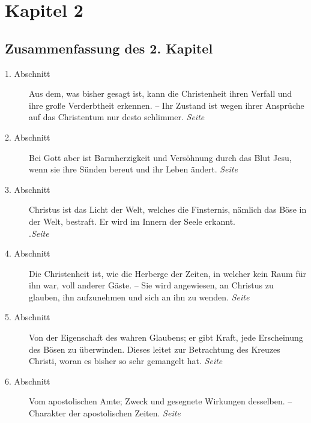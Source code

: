 
\chapter{Kapitel 2} \label{kap2}


\section{Zusammenfassung des 2. Kapitel}

\begin{description}
\item[1. Abschnitt] Aus dem, was bisher gesagt ist, kann die Christenheit ihren
Verfall und ihre große Verderbtheit erkennen. -- Ihr Zustand ist wegen ihrer
Ansprüche auf das Christentum
 nur desto schlimmer.
\dotfill \textit{Seite~\pageref{kap2_ab1}}\\

\item[2. Abschnitt] Bei Gott aber ist Barmherzigkeit und Versöhnung durch das
Blut Jesu, wenn sie ihre Sünden bereut und ihr Leben ändert.
\dotfill \textit{Seite~\pageref{kap2_ab2}}\\

\item[3. Abschnitt] Christus ist das Licht der Welt, welches die Finsternis,
nämlich das Böse in der Welt, bestraft. Er wird im Innern der Seele erkannt.
\\.\dotfill \textit{Seite~\pageref{kap2_ab3}}\\

\item[4. Abschnitt] Die Christenheit ist, wie die Herberge der Zeiten, in
welcher kein Raum für ihn war, voll anderer Gäste. -- Sie wird angewiesen, an
Christus zu glauben, ihn aufzunehmen und sich an ihn zu wenden.
\dotfill \textit{Seite~\pageref{kap2_ab4}}\\

\item[5. Abschnitt] Von der Eigenschaft des wahren Glaubens; er gibt Kraft,
jede Erscheinung des Bösen zu überwinden. Dieses leitet%
 zur Betrachtung des
Kreuzes Christi, woran es bisher so sehr gemangelt hat.
\dotfill \textit{Seite~\pageref{kap2_ab5}}\\

\item[6. Abschnitt] Vom apostolischen Amte; Zweck und gesegnete Wirkungen
desselben. -- Charakter der apostolischen Zeiten.
\dotfill \textit{Seite~\pageref{kap2_ab6}}\\


\end{description}
